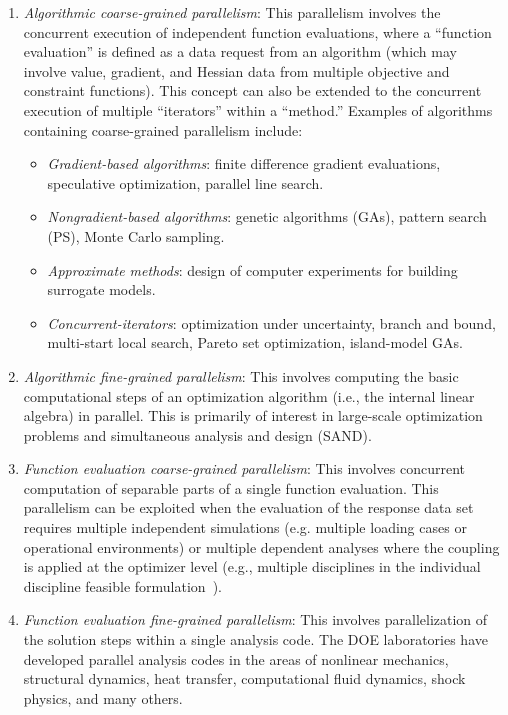 \begin{enumerate}
\item \emph{Algorithmic coarse-grained parallelism}: This parallelism
  involves the concurrent execution of independent function
  evaluations, where a ``function evaluation'' is defined as a data
  request from an algorithm (which may involve value, gradient, and
  Hessian data from multiple objective and constraint functions). This
  concept can also be extended to the concurrent execution of multiple
  ``iterators'' within a ``method.'' Examples of algorithms
  containing coarse-grained parallelism include:
  \begin{itemize}
  \item \emph{Gradient-based algorithms}: finite difference gradient
    evaluations, speculative optimization, parallel line search.

  \item \emph{Nongradient-based algorithms}: genetic algorithms (GAs),
    pattern search (PS), Monte Carlo sampling.

  \item \emph{Approximate methods}: design of computer experiments for
    building surrogate models.

  \item \emph{Concurrent-iterators}: optimization under
    uncertainty, branch and bound, multi-start local search, Pareto
    set optimization, island-model GAs.
  \end{itemize}

\item \emph{Algorithmic fine-grained parallelism}: This involves
  computing the basic computational steps of an optimization algorithm
  (i.e., the internal linear algebra) in parallel. This is primarily
  of interest in large-scale optimization problems and simultaneous
  analysis and design (SAND).

\item \emph{Function evaluation coarse-grained parallelism}: This
  involves concurrent computation of separable parts of a single
  function evaluation. This parallelism can be exploited when the
  evaluation of the response data set requires multiple independent
  simulations (e.g. multiple loading cases or operational
  environments) or multiple dependent analyses where the coupling is
  applied at the optimizer level (e.g., multiple disciplines in the
  individual discipline feasible formulation~\cite{Den94a}).

\item \emph{Function evaluation fine-grained parallelism}: This
  involves parallelization of the solution steps within a single
  analysis code.  The DOE laboratories have developed parallel
  analysis codes in the areas of nonlinear mechanics, structural
  dynamics, heat transfer, computational fluid dynamics, shock
  physics, and many others.
\end{enumerate}

